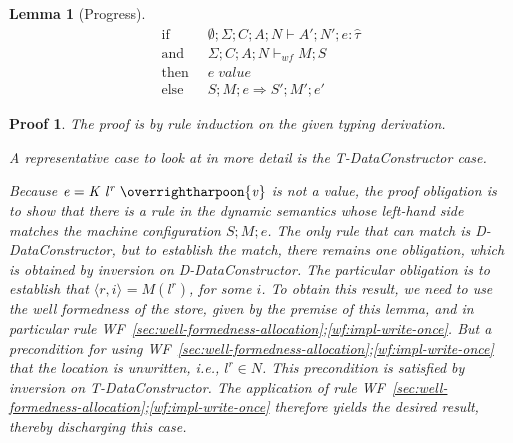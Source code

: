 \documentclass[showabstract,showacknowledgments,showpreface,showdedication,school]{iuphd}
\newtheorem{lemma}[theorem]{Lemma}
\theoremstyle{nonumberplain}
\newtheorem{nproof}{Proof}
\newcommand{\keywd}[1]{\mathit{#1}}
\newcommand{\skeywd}[1]{\mathit{#1}}
\newcommand{\DC}{\keywd{K}}
\newcommand{\EXPR}{\keywd{e}}
\newcommand{\hTYP}{\keywd{\hat{\tau}}}
\newcommand{\loc}{\skeywd{l}}
\newcommand{\concreteloc}[3]{\ensuremath{\langle #1, #2 \rangle ^{#3}}}
\newcommand{\reg}{\skeywd{r}}
\newcommand{\ind}{\keywd{i}}
\newcommand{\VAL}{\keywd{v}}
\newcommand{\STOR}{\keywd{S}}
\newcommand{\stepsto}{\Rightarrow}
\newcommand{\datacon}[3]{\ensuremath{#1 \;#2 \;#3}}
\newcommand{\CENV}{\keywd{C}}
\newcommand{\SENV}{\keywd{\Sigma}}
\newcommand{\MENV}{\keywd{M}}
\newcommand{\AENV}{\keywd{A}}
\newcommand{\NENV}{\keywd{N}}
\newcommand{\locreg}[2]{\ensuremath{{#1}^{#2}}}
\newcommand{\storewf}[6]{\ensuremath{#1;#2;#3;#4 \vdash_{wf} #5;#6}}
\newcommand{\refwellformed}[2]{WF~\ref{#1};\ref{#2}}
\newcommand{\tdatacon}{T-DataConstructor}
\newcommand{\ddatacon}{D-DataConstructor}
\newcommand{\overharpoon}[1]{\overrightharpoon{#1}}
\begin{document}
\begin{lemma}[Progress]
  \label{lemma:progress_brief}
  \begin{displaymath}
  \begin{aligned}
  \text{if} \;\; & \emptyset;\SENV;\CENV;\AENV;\NENV \vdash \AENV';\NENV';\EXPR : \hTYP \\
  \text{and} \;\; & \storewf{\SENV}{\CENV}{\AENV}{\NENV}{\MENV}{\STOR} \\
  \text{then} \;\; & \EXPR \; \mathit{value} \\
  \text{else} \;\; & \STOR;\MENV;\EXPR \stepsto \STOR';\MENV';\EXPR'
  \end{aligned}
  \end{displaymath}
\end{lemma}
\begin{nproof}
  The proof is by rule induction on the given typing derivation.

  A representative case to look at in more detail is the \tdatacon{} case.

    Because $\EXPR = \datacon{\DC}{\keywd{\locreg{\loc}{\reg}}}{\overharpoon{\VAL}}$ is not
    a value, the proof obligation is to show that there is a rule in the dynamic semantics whose
    left-hand side matches the machine configuration $\STOR;\MENV;\EXPR$.
    The only rule that can match is \ddatacon{}, but to establish the
    match, there remains one obligation, which is obtained
    by inversion on \ddatacon{}.
    The particular obligation is to establish that
    $\concreteloc{\reg}{\ind}{} = \MENV(\locreg{\loc}{\reg})$,
    for some $\ind$.
    To obtain this result, we need to use the well formedness
    of the store, given by the premise of this lemma, and in particular rule
    \refwellformed{sec:well-formedness-allocation}{wf:impl-write-once}.
    But a precondition for using
    \refwellformed{sec:well-formedness-allocation}{wf:impl-write-once} that
    the location is unwritten, i.e., $\locreg{\loc}{\reg} \in \NENV$.
    This precondition is satisfied by inversion on \tdatacon{}.
    The application of rule \refwellformed{sec:well-formedness-allocation}{wf:impl-write-once}
    therefore yields the desired result, thereby discharging this case.


    
    
\end{nproof}
\end{document}
